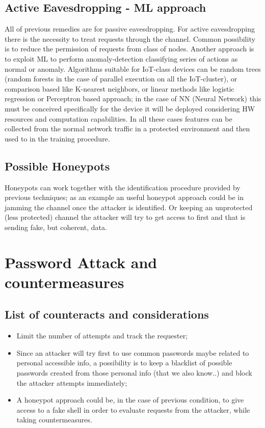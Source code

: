 \subsection{Active Eavesdropping - ML approach}
All of previous remedies are for passive eavesdropping. For active eavesdropping there is the necessity to treat requests through the channel. Common possibility is to reduce the permission of requests from class of nodes. Another approach is to exploit ML to perform anomaly-detection classifying series of actions as normal or anomaly. Algorithms suitable for IoT-class devices can be random trees (random forests in the case of parallel execution on all the IoT-cluster), or comparison based like K-nearest neighbors, or linear methods like logistic regression or Perceptron based approach; in the case of NN (Neural Network) this must be conceived specifically for the device it will be deployed considering HW resources and computation capabilities. In all these cases features can be collected from the normal network traffic in a protected environment and then used to in the training procedure.

\subsection{Possible Honeypots}
Honeypots can work together with the identification procedure provided by previous techniques; as an example an useful honeypot approach could be in jamming the channel once the attacker is identified. Or keeping an unprotected (less protected) channel the attacker will try to get access to first and that is sending fake, but coherent, data.

\section{Password Attack and countermeasures}
\subsection{List of counteracts and considerations}
\begin{itemize}
  \item Limit the number of attempts and track the requester;
  \item Since an attacker will try first to use common passwords maybe related to personal accessible info, a possibility is to keep a blacklist of possible passwords created from those personal info (that we also know..) and block the attacker attempts immediately;
  \item A honeypot approach could be, in the case of previous condition, to give access to a fake shell in order to evaluate requests from the attacker, while taking countermeasures.
\end{itemize}
